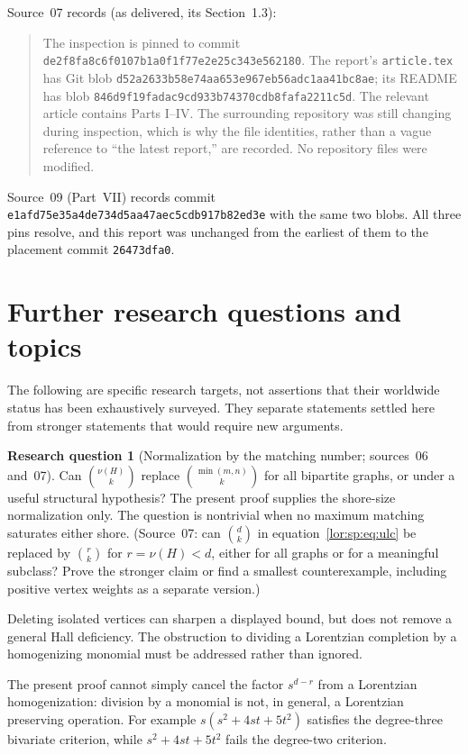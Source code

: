 \documentclass[11pt]{article}
\numberwithin{equation}{section}
\theoremstyle{definition}
\newtheorem{question}{Research question}%
\begin{document}
Source~07 records (as delivered, its Section~1.3):
\begin{quote}\small
The inspection is pinned to commit
\texttt{de2f8fa8c6f0107b1a0f1f77e2e25c343e562180}.
The report's \texttt{article.tex} has Git blob
\texttt{d52a2633b58e74aa653e967eb56adc1aa41bc8ae}; its README has blob
\texttt{846d9f19fadac9cd933b74370cdb8fafa2211c5d}. The relevant article
contains Parts I--IV. The surrounding repository was still changing during
inspection, which is why the file identities, rather than a vague reference
to ``the latest report,'' are recorded. No repository files were modified.
\end{quote}
Source~09 (Part~VII) records commit
\texttt{e1afd75e35a4de734d5aa47aec5cdb917b82ed3e} with the same two blobs.
All three pins resolve, and this report was unchanged from the earliest of
them to the placement commit \texttt{26473dfa0}.

\section{Further research questions and topics}
\label{lor:sec:future}
The following are specific research targets, not assertions that their
worldwide status has been exhaustively surveyed. They separate statements
settled here from stronger statements that would require new arguments.

\begin{question}[Normalization by the matching number; sources~06 and~07]\label{lor:q:first}
Can $\binom{\nu(H)}k$ replace $\binom{\min(m,n)}k$ for all bipartite graphs,
or under a useful structural hypothesis? The present proof supplies the
shore-size normalization only. The question is nontrivial when no maximum
matching saturates either shore.
(Source~07: can $\binom d k$ in equation~\eqref{lor:sp:eq:ulc} be replaced by $\binom r k$ for
$r=\nu(H)<d$, either for all graphs or for a meaningful subclass? Prove the
stronger claim or find a smallest counterexample, including positive vertex
weights as a separate version.)
\end{question}
Deleting isolated vertices can sharpen a displayed bound, but does not
remove a general Hall deficiency. The obstruction to dividing a
Lorentzian completion by a homogenizing monomial must be addressed rather
than ignored.

The present proof cannot simply cancel the factor $s^{d-r}$ from a Lorentzian
homogenization: division by a monomial is not, in general, a Lorentzian
preserving operation. For example $s(s^2+4st+5t^2)$ satisfies the degree-three
bivariate criterion, while $s^2+4st+5t^2$ fails the degree-two criterion.
\end{document}
